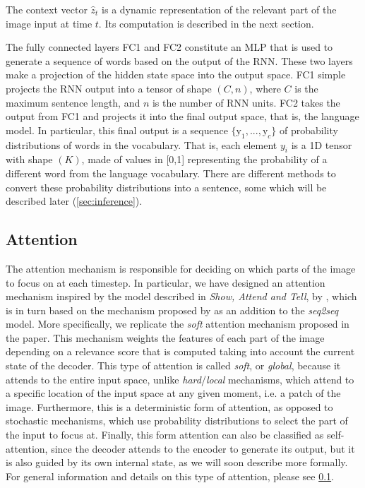 The context vector $\hat{z}_t$ is a dynamic representation of the relevant part of the image input at time $t$. Its computation is described in the next section.

The fully connected layers FC1 and FC2 constitute an MLP that is used to generate a sequence of words based on the output of the RNN. These two layers make a projection of the hidden state space into the output space. FC1 simple projects the RNN output into a tensor of shape $(C, n)$, where $C$ is the maximum sentence length, and $n$ is the number of RNN units. FC2 takes the output from FC1 and projects it into the final output space, that is, the language model. In particular, this final output is a sequence  $\{\text{y}_1,..., \text{y}_c\}$ of probability distributions of words in the vocabulary. That is, each element $y_i$ is a 1D tensor with shape $(K)$, made of values in [0,1] representing the probability of a different word from the language vocabulary. There are different methods to convert these probability distributions into a sentence, some which will be described later (\cref{sec:inference}).

\subsection{Attention}\label{subsec:attention}

The attention mechanism is responsible for deciding on which parts of the image to focus on at each timestep. In particular, we have designed an attention mechanism inspired by the model described in \textit{Show, Attend and Tell}, by \citet{Xu2015}, which is in turn based on the mechanism proposed by \citet{Bahdanau2015} as an addition to the \textit{seq2seq} model. More specifically, we replicate the  \textit{soft} attention mechanism proposed in the paper. This mechanism weights the features of each part of the image depending on a relevance score that is computed taking into account the current state of the decoder. This type of attention is called \textit{soft}, or \textit{global}, because it attends to the entire input space, unlike \textit{hard}/\textit{local} mechanisms, which attend to a specific location of the input space at any given moment, i.e. a patch of the image. Furthermore, this is a deterministic form of attention, as opposed to stochastic mechanisms, which use probability distributions to select the part of the input to focus at. Finally, this form attention can also be classified as self-attention, since the decoder attends to the encoder to generate its output, but it is also guided by its own internal state, as we will soon describe more formally. For general information and details on this type of attention, please see \cref{subsec:attention}. 

